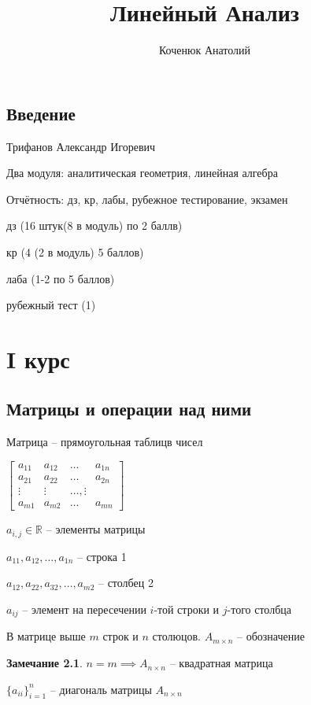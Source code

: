 \documentclass{book}
\author{Коченюк Анатолий}
\title{Линейный Анализ}
\newcommand\R{\ensuremath{\mathbb{R}}}
\theoremstyle{definition}
\newtheorem*{note}{Замечание}
\begin{document}
    \maketitle
    \section{Введение}
    Трифанов Александр Игоревич

    Два модуля: аналитическая геометрия, линейная алгебра

    Отчётность: дз, кр, лабы, рубежное тестирование, экзамен

    дз (16 штук(8 в модуль) по 2 баллв)
    
    кр (4 (2 в модуль) 5 баллов)

    лаба (1-2 по 5 баллов)

    рубежный тест (1)



    \chapter{I курс}
    \section{Матрицы и операции над ними}

    \begin{definition}
        Матрица -- прямоугольная таблицв чисел
    \end{definition}

    $\begin{bmatrix} 
        a_{11}&a_{12}&\ldots & a_{1n}\\
        a_{21}&a_{22}&\ldots &a_{2n}\\
        \vdots & \vdots & \ldots, \vdots\\
        a_{m 1}& a_{m 2 } & \ldots & a_{m n}
     \end{bmatrix} $

     $a_{i,j}\in \R$ -- элементы матрицы

     $a_{11}, a_{12}, \ldots, a_{1n}$ -- строка 1
     
     $a_{12}, a_{22}, a_{32}, \ldots, a_{m 2}$ -- столбец 2

     $a_{ij}$ -- элемент на пересечении $i$-той строки и $j$-того столбца

     В матрице выше $m$ строк и $n$ столюцов. $A_{m\times n}$ -- обозначение

     \begin{note}
         $n=m \implies A_{n\times n}$ -- квадратная матрица 

         $\{a_{ii}\}_{i=1}^n$ -- диагональ матрицы $A_{n\times n}$
     \end{note}
\end{document}
